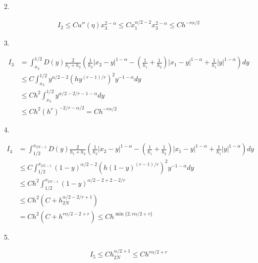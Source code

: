 \documentclass{ctexart}
\begin{document}
2.

\begin{equation}
    \begin{aligned}
        I_2 \le C u''(\eta) x_3^{2-\alpha} \le C x_1^{\alpha/2-2} x_3^{2-\alpha} \le C h^{-r\alpha/2}
    \end{aligned}
\end{equation}

3.

\begin{equation}
    \begin{aligned}
        I_3 & = \int_{x_3}^{1/2}D(y) \frac{2}{h_1 + h_{2}}
        ( \frac{1}{h_{2}} |x_{2}-y|^{1-\alpha}
        - (\frac{1}{h_{1}}+\frac{1}{h_{2}}) |x_{1}-y|^{1-\alpha}
        +  \frac{1}{h_{1}}|y|^{1-\alpha} )  dy                                         \\
            & \le C \int_{x_3}^{1/2} y^{\alpha/2-2} (h y^{(r-1)/r})^2 y^{-1-\alpha} dy \\
            & \le C h^2 \int_{x_3}^{1/2} y^{\alpha/2 - 2/r -1 - \alpha} dy             \\
            & \le C h^2 (h^r)^{-2/r-\alpha/2} = C h^{-r\alpha/2}
    \end{aligned}
\end{equation}


4.

\begin{equation}
    \begin{aligned}
        I_4 & = \int_{1/2}^{x_{2N-1}}D(y) \frac{2}{h_1 + h_{2}}
        ( \frac{1}{h_{2}} |x_{2}-y|^{1-\alpha}
        - (\frac{1}{h_{1}}+\frac{1}{h_{2}}) |x_{1}-y|^{1-\alpha}
        +  \frac{1}{h_{1}}|y|^{1-\alpha} )  dy                                                      \\
            & \le C \int_{1/2}^{x_{2N-1}} (1-y)^{\alpha/2-2} (h (1-y)^{(r-1)/r})^2 y^{-1-\alpha} dy \\
            & \le C h^2 \int_{1/2}^{x_{2N-1}} (1-y)^{\alpha/2-2 + 2 - 2/r}                          \\
            & \le C h^2 (C + h_{2N}^{\alpha/2-2/r+1})                                               \\
            & = C h^2 (C + h^{r\alpha/2-2+r}) \le C h^{\min\{2, r\alpha/2+r\}}
    \end{aligned}
\end{equation}

5.

\begin{equation}
    I_5 \le C h_{2N}^{\alpha/2+1} \le C h^{r\alpha/2+r}
\end{equation}
\end{document}
